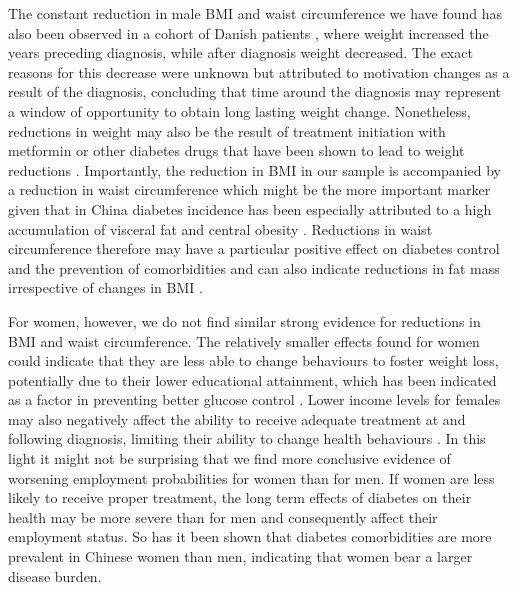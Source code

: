 The constant reduction in male \ac{BMI} and waist circumference we have found has also been observed in a cohort of Danish patients \autocite{DeFineOlivarius2015}, where weight increased the years preceding diagnosis, while after diagnosis weight decreased. The exact reasons for this decrease were unknown but attributed to motivation changes as a result of the diagnosis, concluding that time around the diagnosis may represent a window of opportunity to obtain long lasting weight change. Nonetheless, reductions in weight may also be the result of treatment initiation with metformin or other diabetes drugs that have been shown to lead to weight reductions \autocite{Yang2014}. Importantly, the reduction in \ac{BMI} in our sample is accompanied by a reduction in waist circumference which might be the more important marker given that in China diabetes incidence has been especially attributed to a high accumulation of visceral fat and central obesity \autocite{Ma2014}. Reductions in waist circumference therefore may have a particular positive effect on diabetes control and the prevention of comorbidities and can also indicate reductions in fat mass irrespective of changes in \ac{BMI} \autocite{Klein2007}.

For women, however, we do not find similar strong evidence for reductions in \ac{BMI} and waist circumference. The relatively smaller effects found for women could indicate that they are less able to change behaviours to foster weight loss, potentially due to their lower educational attainment, which has been indicated as a factor in preventing better glucose control \autocite{Luo2015}. Lower income levels for females may also negatively affect the ability to receive adequate treatment at and following diagnosis, limiting their ability to change health behaviours \autocite{Luo2015}. In this light it might not be surprising that we find more conclusive evidence of worsening employment probabilities for women than for men. If women are less likely to receive proper treatment, the long term effects of diabetes on their health may be more severe than for men and consequently affect their employment status. So has it been shown that diabetes comorbidities are more prevalent in Chinese women than men, indicating that women bear a larger disease burden.\autocite{Liu2010} 

